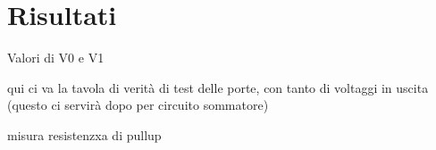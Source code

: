 \section{Risultati}\label{sec:risultati}
  Valori di V0 e V1 %

qui ci va la tavola di verità di test delle porte, con tanto di voltaggi in uscita (questo ci servirà dopo per circuito sommatore)

misura resistenzxa di pullup
